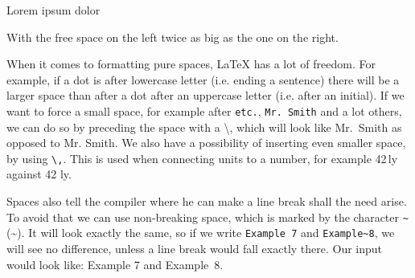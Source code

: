 Lorem \hfill \hfill ipsum \hfill dolor

With the free space on the left twice as big as the one on the right.

When it comes to formatting pure spaces, \LaTeX{} has a lot of freedom. For example, if a dot is after lowercase letter (i.e. ending a sentence) there will be a larger space than after a dot after an uppercase letter (i.e. after an initial). If we want to force a small space, for example after \verb|etc.|, \verb|Mr. Smith| and a lot others, we can do so by preceding the space with a \textbackslash, which will look like Mr.\ Smith as opposed to Mr. Smith. We also have a possibility of inserting even smaller space, by using \verb|\,|. This is used when connecting units to a number, for example 42\,ly against 42 ly.

Spaces also tell the compiler where he can make a line break shall the need arise. To avoid that we can use non-breaking space, which is marked by the character \verb|~| (\textasciitilde{}). It will look exactly the same, so if we write \verb|Example 7| and \verb|Example~8|, we will see no difference, unless a line break would fall exactly there. Our input would look like: Example 7 and Example~8.